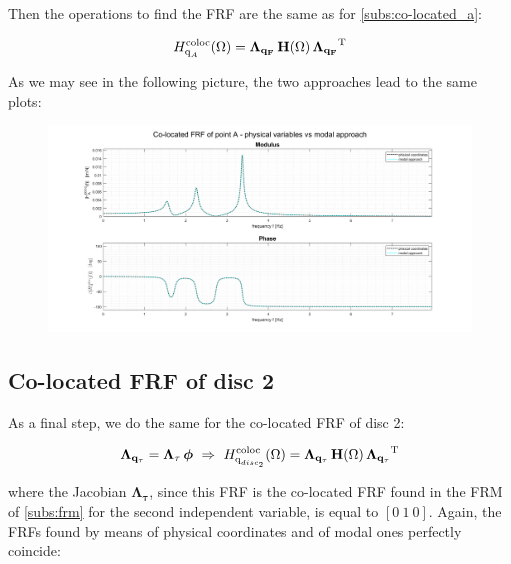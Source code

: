 \documentclass[a4paper,12pt,oneside]{article}
\begin{document}
\vspace{10pt}

Then the operations to find the FRF are the same as for \ref{subs:co-located_a}:

\[
	H^\textup{coloc}_{\textup{q}_A}(\Omega) =
		\mathbf{\Lambda_{q_F}} \, \mathbf{H}(\Omega) \,
		\mathbf{\Lambda_{q_F}}^\textup{T}
\]

\vspace{30pt}

As we may see in the following picture, the two approaches lead to the same plots:

\vspace{30pt}

\begin{figure}[h]
	\hspace{-70pt}
	\includegraphics[scale=0.4]{co-located_a_physical_vs_modal}
\end{figure}

\clearpage

\subsection{Co-located FRF of disc 2}

\vspace{30pt}

As a final step, we do the same for the co-located FRF of disc 2:

\[
	\mathbf{\Lambda_{q_\tau}} = \mathbf{\Lambda_\tau} \, \bm{\phi} ~ \Rightarrow ~
		H^\textup{coloc}_{\textup{q}_{disc_2}}(\Omega) =
		\mathbf{\Lambda_{q_\tau}} \, \mathbf{H}(\Omega) \,
		\mathbf{\Lambda_{q_\tau}}^\textup{T}
\]

\vspace{10pt}

where the Jacobian $ \mathbf{\Lambda_\tau} $, since this FRF is the co-located FRF found in the FRM of \ref{subs:frm} for the second independent variable, is equal to $ [0 ~ 1 ~ 0] $. Again, the FRFs found by means of physical coordinates and of modal ones perfectly coincide:
\end{document}

